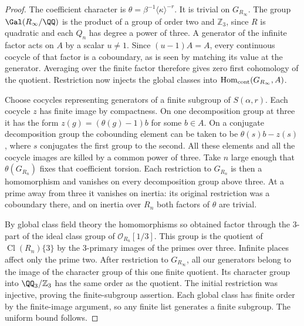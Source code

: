 \documentclass[a4paper,11pt]{article}
\theoremstyle{definition}
\theoremstyle{remark}
\newcommand{\ZZ}{\mathbb Z}\newcommand{\ord}{\operatorname{ord}}
\numberwithin{equation}{section}
\newcommand{\Cl}{\operatorname{Cl}}
\begin{document}
\begin{proof}
The coefficient character is
\(\theta=\beta^{-1}\langle\kappa\rangle^{-r}\).
It is trivial on \(G_{R_\infty}\). The group
\(\Gal(R_\infty/\QQ)\) is the product of a group of order two
and \(\ZZ_3\), since \(R\) is quadratic and each \(Q_n\) has
degree a power of three. A generator of the infinite factor
acts on \(A\) by a scalar \(u\ne1\). Since \((u-1)A=A\), every
continuous cocycle of that factor is a coboundary, as is seen
by matching its value at the generator. Averaging over the
finite factor therefore gives zero first cohomology of the
quotient. Restriction now injects the global classes into
\(\operatorname{Hom}_{\rm cont}(G_{R_\infty},A)\).

Choose cocycles representing generators of a finite subgroup
of \(S(\alpha,r)\). Each cocycle \(z\) has finite image by
compactness. On one decomposition group at three it has the
form \(z(g)=(\theta(g)-1)b\) for some \(b\in A\). On a
conjugate decomposition group the cobounding element can be
taken to be \(\theta(s)b-z(s)\), where \(s\) conjugates the
first group to the second. All these elements and all the
cocycle images are killed by a common power of three. Take \(n\)
large enough that \(\theta(G_{R_n})\) fixes that coefficient
torsion. Each restriction to \(G_{R_n}\) is then a homomorphism
and vanishes on every decomposition group above three. At a
prime away from three it vanishes on inertia: its original
restriction was a coboundary there, and on inertia over \(R_n\)
both factors of \(\theta\) are trivial.

By global class field theory the homomorphisms so obtained
factor through the \(3\)-part of the ideal class group of
\(\mathcal O_{R_n}[1/3]\). This group is the quotient of
\(\Cl(R_n)\{3\}\) by the \(3\)-primary images of the primes
over three. Infinite places affect only the prime two.
After restriction to \(G_{R_\infty}\), all our generators belong
to the image of the character group of this one finite quotient.
Its character group into \(\QQ_3/\ZZ_3\) has the same order
as the quotient. The initial restriction was injective, proving
the finite-subgroup assertion. Each global class has finite
order by the finite-image argument, so any finite list generates
a finite subgroup. The uniform bound follows.
\end{proof}
\end{document}
